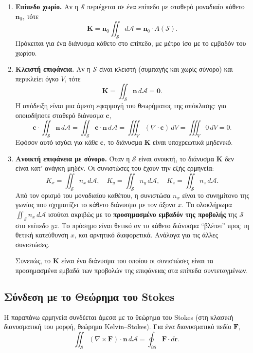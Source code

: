 \documentclass[10pt,a4paper,twoside,openany]{book}
\theoremstyle{plain}
\theoremstyle{definition}
\theoremstyle{remark}
\numberwithin{equation}{section}
\begin{document}
\begin{enumerate}
\item \textbf{Επίπεδο χωρίο.} Αν η \(\mathcal{S}\) περιέχεται σε ένα επίπεδο με σταθερό μοναδιαίο κάθετο \(\mathbf{n}_0\), τότε
\[
\mathbf{K} = \mathbf{n}_0 \iint_{\mathcal{S}} d\mathcal{A} = \mathbf{n}_0 \cdot A(\mathcal{S}).
\]
Πρόκειται για ένα διάνυσμα κάθετο στο επίπεδο, με μέτρο ίσο με το εμβαδόν του χωρίου.

\item \textbf{Κλειστή επιφάνεια.} Αν η \(\mathcal{S}\) είναι κλειστή (συμπαγής και χωρίς σύνορο) και περικλείει όγκο \(V\), τότε
\[
\mathbf{K} = \iint_{\mathcal{S}} \mathbf{n} \, d\mathcal{A} = \mathbf{0}.
\]
Η απόδειξη είναι μια άμεση εφαρμογή του θεωρήματος της απόκλισης: για οποιοδήποτε σταθερό διάνυσμα \(\mathbf{c}\),
\[
\mathbf{c} \cdot \iint_{\mathcal{S}} \mathbf{n} \, d\mathcal{A} = \iint_{\mathcal{S}} \mathbf{c} \cdot \mathbf{n} \, d\mathcal{A} = \iiint_V (\nabla \cdot \mathbf{c}) \, dV = \iiint_V 0 \, dV = 0.
\]
Εφόσον αυτό ισχύει για κάθε \(\mathbf{c}\), το διάνυσμα \(\mathbf{K}\) είναι υποχρεωτικά μηδενικό.

\item \textbf{Ανοικτή επιφάνεια με σύνορο.} Όταν η \(\mathcal{S}\) είναι ανοικτή, το διάνυσμα \(\mathbf{K}\) δεν είναι κατ' ανάγκη μηδέν. Οι συνιστώσες του έχουν την εξής ερμηνεία:
\[
K_x = \iint_{\mathcal{S}} n_x \, d\mathcal{A}, \quad K_y = \iint_{\mathcal{S}} n_y \, d\mathcal{A}, \quad K_z = \iint_{\mathcal{S}} n_z \, d\mathcal{A}.
\]
Από τον ορισμό του μοναδιαίου καθέτου, η συνιστώσα \(n_x\) είναι το συνημίτονο της γωνίας που σχηματίζει το κάθετο διάνυσμα με τον άξονα \(x\). Το ολοκλήρωμα \(\iint_{\mathcal{S}} n_x \, d\mathcal{A}\) ισούται ακριβώς με το \textbf{προσημασμένο εμβαδόν της προβολής} της \(\mathcal{S}\) στο επίπεδο \(yz\). Το πρόσημο είναι θετικό αν το κάθετο διάνυσμα ``βλέπει'' προς τη θετική κατεύθυνση \(x\), και αρνητικό διαφορετικά. Ανάλογα για τις άλλες συνιστώσες.

Συνεπώς, το \(\mathbf{K}\) είναι ένα διάνυσμα του οποίου οι συνιστώσες είναι τα προσημασμένα εμβαδά των προβολών της επιφάνειας στα επίπεδα συντεταγμένων.
\end{enumerate}

\subsection{Σύνδεση με το Θεώρημα του Stokes}

Η παραπάνω ερμηνεία συνδέεται άμεσα με το θεώρημα του Stokes (στη κλασική διανυσματική του μορφή, θεώρημα Kelvin--Stokes). Για ένα διανυσματικό πεδίο \(\mathbf{F}\),
\[
\iint_{\mathcal{S}} (\nabla \times \mathbf{F}) \cdot \mathbf{n} \, d\mathcal{A} = \oint_{\partial \mathcal{S}} \mathbf{F} \cdot d\mathbf{r}.
\]
\end{document}
